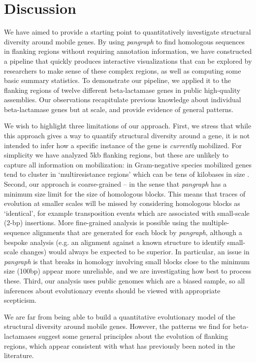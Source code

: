 \documentclass[rmp,superscriptaddress,11pt]{revtex4-1}
\begin{document}
\section{Discussion}

\noindent We have aimed to provide a starting point to quantitatively investigate structural diversity around mobile genes. By using \textit{pangraph} to find homologous sequences in flanking regions without requiring annotation information, we have constructed a pipeline that quickly produces interactive visualizations that can be explored by researchers to make sense of these complex regions, as well as computing some basic summary statistics. To demonstrate our pipeline, we applied it to the flanking regions of twelve different beta-lactamase genes in public high-quality assemblies. Our observations recapitulate previous knowledge about individual beta-lactamase genes but at scale, and provide evidence of general patterns.

We wish to highlight three limitations of our approach. First, we stress that while this approach gives a way to quantify structural diversity around a gene, it is not intended to infer how a specific instance of the gene is \textit{currently} mobilized. For simplicity we have analyzed 5kb flanking regions, but these are unlikely to capture all information on mobilization: in Gram-negative species mobilized genes tend to cluster in `multiresistance regions’ which can be tens of kilobases in size \cite{Partridge2021}. Second, our approach is coarse-grained {--} in the sense that \textit{pangraph} has a minimum size limit for the size of homologous blocks. This means that traces of evolution at smaller scales will be missed by considering homologous blocks as ‘identical’, for example transposition events which are associated with small-scale (2-bp) insertions. More fine-grained analysis is possible using the multiple-sequence alignments that are generated for each block by \textit{pangraph}, although a bespoke analysis (e.g. an alignment against a known structure to identify small-scale changes) would always be expected to be superior. In particular, an issue in \textit{pangraph} is that breaks in homology involving small blocks close to the minimum size (100bp) appear more unreliable, and we are investigating how best to process these. Third, our analysis uses public genomes which are a biased sample, so all inferences about evolutionary events should be viewed with appropriate scepticism.

We are far from being able to build a quantitative evolutionary model of the structural diversity around mobile genes. However, the patterns we find for beta-lactamases suggest some general principles about the evolution of flanking regions, which appear consistent with what has previously been noted in the literature.\par 
\end{document}
